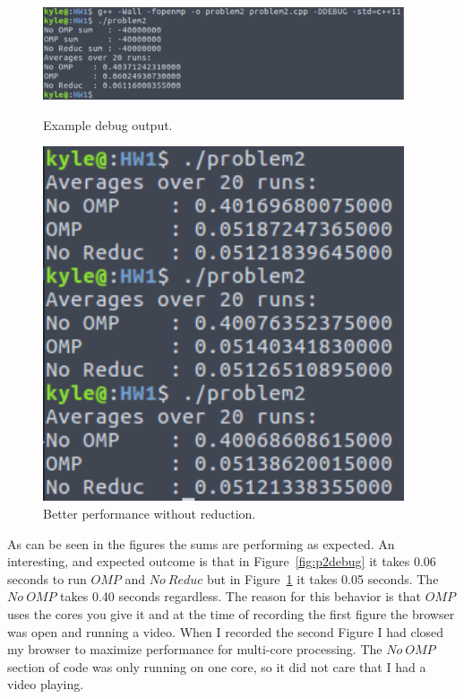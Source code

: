 \documentclass{article}
\begin{document}
\begin{figure}[h]
    \centering
    \begin{minipage}{0.7\textwidth}
        \centering
        \includegraphics[width=0.95\textwidth]{Problem2debug}
        \caption{Example debug output.}
        \label{fig:p2debug}
    \end{minipage}\hfill
    \begin{minipage}{0.3\textwidth}
        \centering
        \includegraphics[width=0.95\textwidth]{Problem2_60}
        \caption{Better performance without reduction.}
        \label{fig:p2}
    \end{minipage}
\end{figure}

As can be seen in the figures the sums are performing as expected. An interesting, and expected outcome is that in Figure~\ref{fig:p2debug} it takes 0.06 seconds to run $OMP$ and $No\ Reduc$ but in Figure~\ref{fig:p2} it takes 0.05 seconds. The $No\ OMP$ takes 0.40 seconds regardless. The reason for this behavior is that $OMP$ uses the cores you give it and at the time of recording the first figure the browser was open and running a video. When I recorded the second Figure I had closed my browser to maximize performance for multi-core processing. The $No\ OMP$ section of code was only running on one core, so it did not care that I had a video playing.
\end{document}
